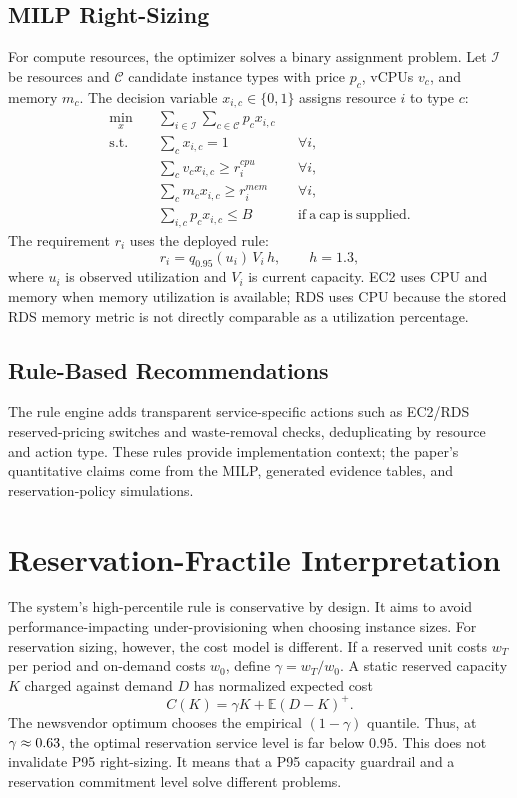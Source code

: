 \documentclass[conference]{IEEEtran}
\newcommand{\E}{\mathbb{E}}
\newcommand{\pos}[1]{\left(#1\right)^+}
\begin{document}
\subsection{MILP Right-Sizing}
For compute resources, the optimizer solves a binary assignment problem. Let
$\mathcal{I}$ be resources and $\mathcal{C}$ candidate instance types with
price $p_c$, vCPUs $v_c$, and memory $m_c$. The decision variable
$x_{i,c}\in\{0,1\}$ assigns resource $i$ to type $c$:
\begin{align}
\min_x \quad & \sum_{i\in\mathcal{I}}\sum_{c\in\mathcal{C}} p_c x_{i,c}\\
\mathrm{s.t.}\quad & \sum_c x_{i,c}=1 && \forall i,\\
& \sum_c v_c x_{i,c}\ge r_i^{cpu} && \forall i,\\
& \sum_c m_c x_{i,c}\ge r_i^{mem} && \forall i,\\
& \sum_{i,c} p_c x_{i,c}\le B && \mathrm{if\ a\ cap\ is\ supplied}.
\end{align}
The requirement $r_i$ uses the deployed rule:
\begin{equation}
r_i = q_{0.95}(u_i)\,V_i\,h,\qquad h=1.3,
\end{equation}
where $u_i$ is observed utilization and $V_i$ is current capacity. EC2 uses
CPU and memory when memory utilization is available; RDS uses CPU because the
stored RDS memory metric is not directly comparable as a utilization
percentage.

\subsection{Rule-Based Recommendations}
The rule engine adds transparent service-specific actions such as EC2/RDS
reserved-pricing switches and waste-removal checks, deduplicating by resource
and action type. These rules provide implementation context; the paper's
quantitative claims come from the MILP, generated evidence tables, and
reservation-policy simulations.

\section{Reservation-Fractile Interpretation}

The system's high-percentile rule is conservative by design. It aims to avoid
performance-impacting under-provisioning when choosing instance sizes. For
reservation sizing, however, the cost model is different. If a reserved unit
costs $w_T$ per period and on-demand costs $w_0$, define
$\gamma=w_T/w_0$. A static reserved capacity $K$ charged against demand $D$
has normalized expected cost
\begin{equation}
C(K)=\gamma K+\E\pos{D-K}.
\end{equation}
The newsvendor optimum chooses the empirical $(1-\gamma)$ quantile. Thus, at
$\gamma\approx0.63$, the optimal reservation service level is far
below $0.95$. This does not invalidate P95 right-sizing. It means that a P95
capacity guardrail and a reservation commitment level solve different
problems.
\end{document}
